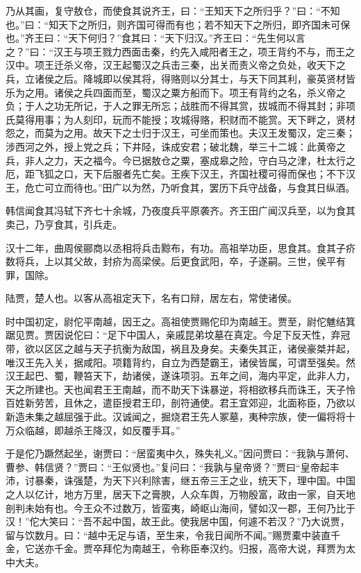 \documentclass[]{article}
\begin{document}
乃从其画，复守敖仓，而使食其说齐王，曰：``王知天下之所归乎？''曰：``不知也。''曰：``知天下之所归，则齐国可得而有也；若不知天下之所归，即齐国未可保也。''齐王曰：``天下何归？''食其曰：``天下归汉。''齐王曰：``先生何以言之？''曰：``汉王与项王戮力西面击秦，约先入咸阳者王之，项王背约不与，而王之汉中。项王迁杀义帝，汉王起蜀汉之兵击三秦，出关而责义帝之负处，收天下之兵，立诸侯之后。降城即以侯其将，得赂则以分其士，与天下同其利，豪英贤材皆乐为之用。诸侯之兵四面而至，蜀汉之粟方船而下。项王有背约之名，杀义帝之负；于人之功无所记，于人之罪无所忘；战胜而不得其赏，拔城而不得其封；非项氏莫得用事；为人刻印，玩而不能授；攻城得赂，积财而不能赏。天下畔之，贤材怨之，而莫为之用。故天下之士归于汉王，可坐而策也。夫汉王发蜀汉，定三秦；涉西河之外，授上党之兵；下井陉，诛成安君；破北魏，举三十二城：此黄帝之兵，非人之力，天之福今。今已据敖仓之粟，塞成皋之险，守白马之津，杜太行之厄，距飞狐之口，天下后服者先亡矣。王疾下汉王，齐国社稷可得而保也；不下汉王，危亡可立而待也。''田广以为然，乃听食其，罢历下兵守战备，与食其日纵酒。

韩信闻食其冯轼下齐七十余城，乃夜度兵平原袭齐。齐王田广闻汉兵至，以为食其卖己，乃亨食其，引兵走。

汉十二年，曲周侯郦商以丞相将兵击黥布，有功。高祖举功臣，思食其。食其子疥数将兵，上以其父故，封疥为高梁侯。后更食武阳，卒，子遂嗣。三世，侯平有罪，国除。

陆贾，楚人也。以客从高祖定天下，名有口辩，居左右，常使诸侯。

时中国初定，尉佗平南越，因王之。高祖使贾赐佗印为南越王。贾至，尉佗魋结箕踞见贾。贾因说佗曰：``足下中国人，亲戚昆弟坟墓在真定。今足下反天性，弃冠带，欲以区区之越与天子抗衡为敌国，祸且及身矣。夫秦失其正，诸侯豪桀并起，唯汉王先入关，据咸阳。项籍背约，自立为西楚霸王，诸侯皆属，可谓至强矣。然汉王起巴、蜀，鞭笞天下，劫诸侯，遂诛项羽。五年之间，海内平定，此非人力，天之所建也。天也闻君王王南越，而不助天下诛暴逆，将相欲移兵而诛王，天子怜百姓新劳苦，且休之，遣臣授君王印，剖符通使。君王宜郊迎，北面称臣，乃欲以新造未集之越屈强于此。汉诚闻之，掘烧君王先人冢墓，夷种宗族，使一偏将将十万众临越，即越杀王降汉，如反覆手耳。''

于是佗乃蹶然起坐，谢贾曰：``居蛮夷中久，殊失礼义。''因问贾曰：``我孰与萧何、曹参、韩信贤？''贾曰：``王似贤也。''复问曰：``我孰与皇帝贤？''贾曰``皇帝起丰沛，讨暴秦，诛强楚，为天下兴利除害，继五帝三王之业，统天下，理中国。中国之人以亿计，地方万里，居天下之膏腴，人众车舆，万物殷富，政由一家，自天地剖判未始有也。今王众不过数万，皆蛮夷，崎岖山海间，譬如汉一郡，王何乃比于汉！''佗大笑曰：``吾不起中国，故王此。使我居中国，何遽不若汉？''乃大说贾，留与饮数月。曰：``越中无足与语，至生来，令我日闻所不闻。''赐贾橐中装直千金，它送亦千金。贾卒拜佗为南越王，令称臣奉汉约。归报，高帝大说，拜贾为太中大夫。
\end{document}
